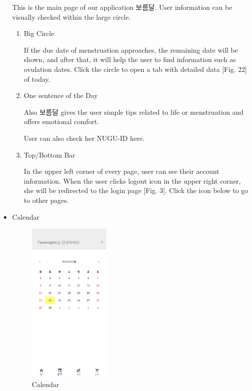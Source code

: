 \documentclass[conference]{IEEEtran}
\begin{document}
\begin{itemize}
    This is the main page of our application 보름달. User information can be visually checked within the large circle.
    \begin{enumerate}
    \setlength{\parindent}{2ex}
    
        \item Big Circle
        
        If the due date of menstruation approaches, the remaining date will be shown, and after that, it will help the user to find information such as ovulation dates.
        Click the circle to open a tab with detailed data [Fig. 22] of today. 
        
        \item One sentence of the Day
        
        Also 보름달 gives the user simple tips related to life or menstruation and offers emotional comfort.
        
        User can also check her NUGU-ID here.
        
        \item Top/Bottom Bar
        
        In the upper left corner of every page, user can see their account information. When the user clicks logout icon in the upper right corner, she will be redirected to the login page [Fig. 3]. 
        Click the icon below to go to other pages.
        
        
    \end{enumerate}
    \item Calendar
    
    \begin{figure}[htbp]
    \includegraphics[width=4cm, height=8cm, center]{cal.png}
    \caption{Calendar}
    \label{fig18}
    \end{figure}
    

\end{itemize}
\end{document}
